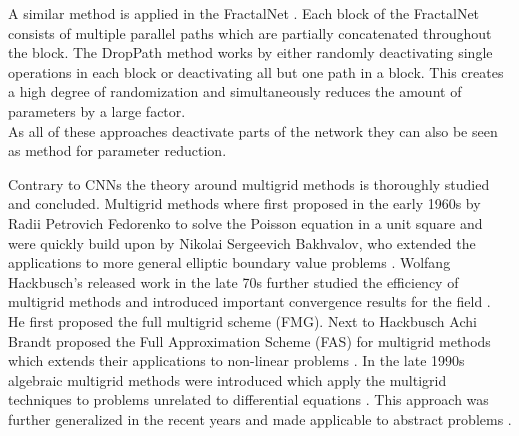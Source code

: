 \documentclass[a4paper,12pt,titlepage,enabledeprecatedfontcommands]{scrreprt}
\begin{document}
A similar method is applied in the FractalNet \cite{DBLP:journals/corr/LarssonMS16a}. Each block of the FractalNet consists of multiple parallel paths which are partially concatenated throughout the block. The DropPath method works by either randomly deactivating single operations in each block or deactivating all but one path in a block. This creates a high degree of randomization and simultaneously reduces the amount of parameters by a large factor. \\
As all of these approaches deactivate parts of the network they can also be seen as method for parameter reduction.

Contrary to CNNs the theory around multigrid methods is thoroughly studied and concluded.
Multigrid methods where first proposed in the early 1960s by Radii Petrovich Fedorenko to solve the Poisson equation in a unit square \cite{FEDORENKO19621092,FEDORENKO1964227} and were quickly build upon by Nikolai Sergeevich Bakhvalov, who extended the applications to more general elliptic boundary value problems \cite{BAKHVALOV1966101}. Wolfang Hackbusch's released work in the late 70s further studied the efficiency of multigrid methods and introduced important convergence results for the field \cite{Hackbusch1977}. He first proposed the full multigrid scheme (FMG). Next to Hackbusch Achi Brandt proposed the Full Approximation Scheme (FAS) for multigrid methods which extends their applications to non-linear problems \cite{Brandt1973,Brandt1977}. In the late 1990s algebraic multigrid methods were introduced which apply the multigrid techniques to problems unrelated to differential equations \cite{stueben1999}. This approach was further generalized in the recent years and made applicable to abstract problems \cite{xu_zikatanov_2017}. \\
\end{document}
